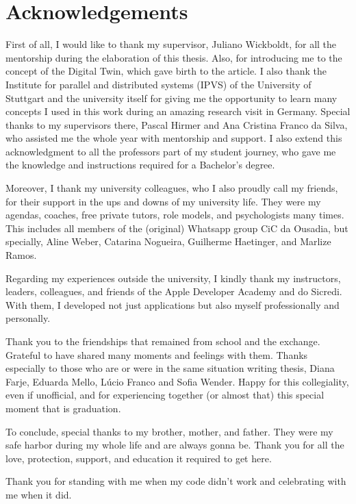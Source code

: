 \chapter*{Acknowledgements}

First of all, I would like to thank my supervisor, Juliano Wickboldt, for all the mentorship during the elaboration of this thesis. Also, for introducing me to the concept of the Digital Twin, which gave birth to the article. I also thank the Institute for parallel and distributed systems (IPVS) of the University of Stuttgart and the university itself for giving me the opportunity to learn many concepts I used in this work during an amazing research visit in Germany. Special thanks to my supervisors there, Pascal Hirmer and Ana Cristina Franco da Silva, who assisted me the whole year with mentorship and support. I also extend this acknowledgment to all the professors part of my student journey, who gave me the knowledge and instructions required for a Bachelor's degree.

Moreover, I thank my university colleagues, who I also proudly call my friends, for their support in the ups and downs of my university life. They were my agendas, coaches, free private tutors, role models, and psychologists many times. This includes all members of the (original) Whatsapp group CiC da Ousadia, but specially, Aline Weber, Catarina Nogueira, Guilherme Haetinger, and Marlize Ramos. 

Regarding my experiences outside the university, I kindly thank my instructors, leaders, colleagues, and friends of the Apple Developer Academy and do Sicredi. With them, I developed not just applications but also myself professionally and personally. 

Thank you to the friendships that remained from school and the exchange. Grateful to have shared many moments and feelings with them. Thanks especially to those who are or were in the same situation writing thesis, Diana Farje, Eduarda Mello, Lúcio Franco and Sofia Wender. Happy for this collegiality, even if unofficial, and for experiencing together (or almost that) this special moment that is graduation.

To conclude, special thanks to my brother, mother, and father. They were my safe harbor during my whole life and are always gonna be. Thank you for all the love, protection, support, and education it required to get here.

Thank you for standing with me when my code didn't work and celebrating with me when it did.

